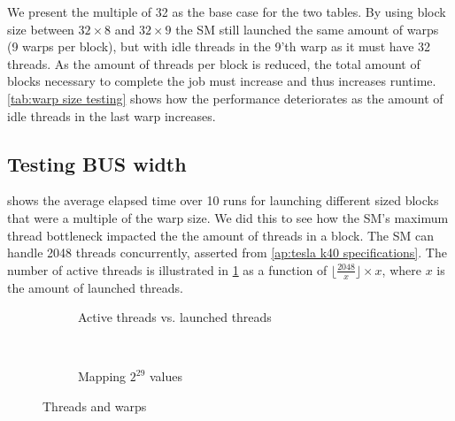 We present the multiple of 32 as the base case for the two tables.
By using block size between $32 \times 8$ and $32 \times 9$ the SM still launched the same amount of warps (9 warps per block), but with idle threads in the 9'th warp as it must have 32 threads.
As the amount of threads per block is reduced, the total amount of blocks necessary to complete the job must increase and thus increases runtime.
\cref{tab:warp size testing} shows how the performance deteriorates as the amount of idle threads in the last warp increases.

\subsection{Testing BUS width}
\label{sec:testing BUS width}

 shows the average elapsed time over 10 runs for launching different sized blocks that were a multiple of the warp size.
We did this to see how the SM's maximum thread bottleneck impacted the the amount of threads in a block.
The SM can handle 2048 threads concurrently, asserted from \cref{ap:tesla k40 specifications}.
The number of active threads is illustrated in \cref{fig:active threads} as a function of \(\lfloor \frac{2048}{x} \rfloor \times x\), where $x$ is the amount of launched threads.

\begin{figure*}[b]
  \centering
  \begin{subfigure}[b]{.49\linewidth}
    \centering
    \resizebox{!}{.80\textwidth}{
      
    }
    \caption{Active threads vs. launched threads}
    \label{fig:active threads}
  \end{subfigure}%
  ~
  \begin{subfigure}[b]{.49\linewidth}
    \centering
    \resizebox{!}{.80\textwidth}{
      
    }
    \caption{Mapping $2^{29}$ values}
    \label{fig:block size testing}
  \end{subfigure}%
  \caption{Threads and warps}
  \label{fig:threads and warps}
\end{figure*}

